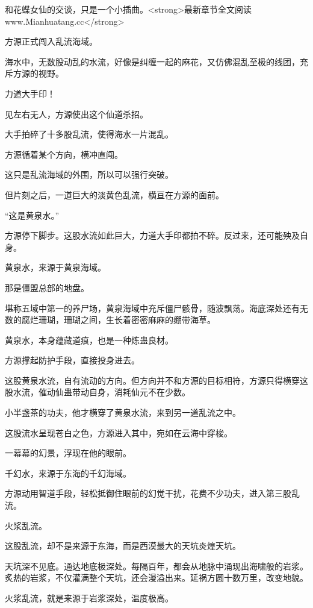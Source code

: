 
\begin{this_body}

和花蝶女仙的交谈，只是一个小插曲。<strong>最新章节全文阅读www.Mianhuatang.cc</strong>

方源正式闯入乱流海域。

海水中，无数股动乱的水流，好像是纠缠一起的麻花，又仿佛混乱至极的线团，充斥方源的视野。

力道大手印！

见左右无人，方源使出这个仙道杀招。

大手拍碎了十多股乱流，使得海水一片混乱。

方源循着某个方向，横冲直闯。

这只是乱流海域的外围，所以可以强行突破。

但片刻之后，一道巨大的淡黄色乱流，横亘在方源的面前。

“这是黄泉水。”

方源停下脚步。这股水流如此巨大，力道大手印都拍不碎。反过来，还可能殃及自身。

黄泉水，来源于黄泉海域。

那是僵盟总部的地盘。

堪称五域中第一的养尸场，黄泉海域中充斥僵尸骸骨，随波飘荡。海底深处还有无数的腐烂珊瑚，珊瑚之间，生长着密密麻麻的绷带海草。

黄泉水，本身蕴藏道痕，也是一种炼蛊良材。

方源撑起防护手段，直接投身进去。

这股黄泉水流，自有流动的方向。但方向并不和方源的目标相符，方源只得横穿这股水流，催动仙蛊带动自身，消耗仙元不在少数。

小半盏茶的功夫，他才横穿了黄泉水流，来到另一道乱流之中。

这股流水呈现苍白之色，方源进入其中，宛如在云海中穿梭。

一幕幕的幻景，浮现在他的眼前。

千幻水，来源于东海的千幻海域。

方源动用智道手段，轻松抵御住眼前的幻觉干扰，花费不少功夫，进入第三股乱流。

火浆乱流。

这股乱流，却不是来源于东海，而是西漠最大的天坑炎煌天坑。

天坑深不见底。通达地底极深处。每隔百年，都会从地脉中涌现出海啸般的岩浆。炙热的岩浆，不仅灌满整个天坑，还会漫溢出来。延祸方圆十数万里，改变地貌。

火浆乱流，就是来源于岩浆深处，温度极高。


\end{this_body}
